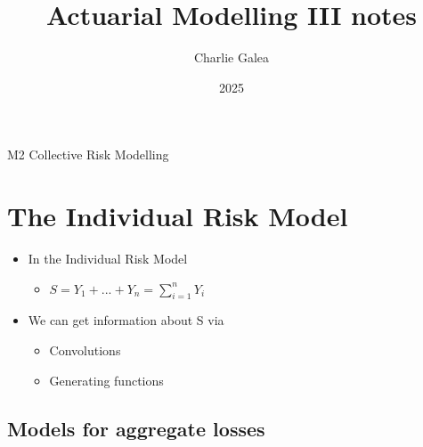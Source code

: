 \documentclass{article}
\begin{document}
\title{Actuarial Modelling III notes}
\author{Charlie Galea}
\date{2025}
\maketitle

\pagebreak

\tableofcontents

\pagebreak

\begin{center}
    \Large{M2 Collective Risk Modelling}
\end{center}
    

\section{The Individual Risk Model}
\begin{itemize}
    \item In the Individual Risk Model
    \begin{itemize}
        \item $S = Y_1 + ... + Y_n = \sum_{i=1}^n Y_i$
    \end{itemize}
    \item We can get information about S via
    \begin{itemize}
        \item Convolutions
        \item Generating functions
    \end{itemize}
\end{itemize}

\subsection{Models for aggregate losses}
\end{document}
